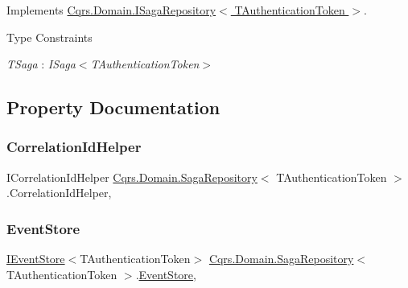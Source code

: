 Implements \hyperlink{interfaceCqrs_1_1Domain_1_1ISagaRepository_ad539cdc70f3168d0335c9510742e25cd}{Cqrs.\+Domain.\+I\+Saga\+Repository$<$ T\+Authentication\+Token $>$}.

\begin{Desc}
\item[Type Constraints]\begin{description}
\item[{\em T\+Saga} : {\em I\+Saga$<$T\+Authentication\+Token$>$}]\end{description}
\end{Desc}


\subsection{Property Documentation}
\mbox{\label{classCqrs_1_1Domain_1_1SagaRepository_a654f9f7c2130864d63515f1504a750fd}} 
\subsubsection{\texorpdfstring{Correlation\+Id\+Helper}{CorrelationIdHelper}}
{\footnotesize\ttfamily I\+Correlation\+Id\+Helper \hyperlink{classCqrs_1_1Domain_1_1SagaRepository}{Cqrs.\+Domain.\+Saga\+Repository}$<$ T\+Authentication\+Token $>$.Correlation\+Id\+Helper\hspace{0.3cm}{\ttfamily [get]}, {\ttfamily [protected]}}

\mbox{\label{classCqrs_1_1Domain_1_1SagaRepository_a4b872f1a20660ece8ce1b54720193fda}} 
\subsubsection{\texorpdfstring{Event\+Store}{EventStore}}
{\footnotesize\ttfamily \hyperlink{interfaceCqrs_1_1Events_1_1IEventStore}{I\+Event\+Store}$<$T\+Authentication\+Token$>$ \hyperlink{classCqrs_1_1Domain_1_1SagaRepository}{Cqrs.\+Domain.\+Saga\+Repository}$<$ T\+Authentication\+Token $>$.\hyperlink{classCqrs_1_1Events_1_1EventStore}{Event\+Store}\hspace{0.3cm}{\ttfamily [get]}, {\ttfamily [protected]}}

